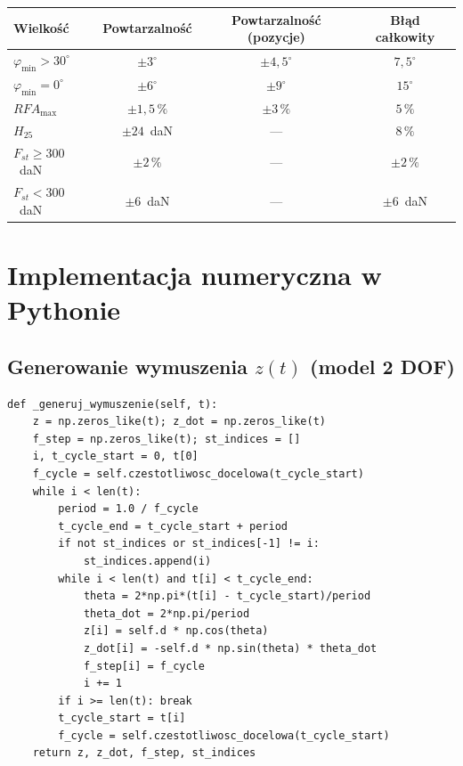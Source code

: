 \documentclass[11pt,a4paper]{article}
\theoremstyle{plainpol}
\begin{document}
\begin{center}
\begin{tabular}{lccc}
\toprule
\textbf{Wielkość} & \textbf{Powtarzalność} & \textbf{Powtarzalność (pozycje)} & \textbf{Błąd całkowity} \\
\midrule
$\varphi_{\min} > 30^\circ$ & $\pm 3^\circ$  & $\pm 4{,}5^\circ$ & $7{,}5^\circ$ \\
$\varphi_{\min} = 0^\circ$  & $\pm 6^\circ$  & $\pm 9^\circ$     & $15^\circ$ \\
$RFA_{\max}$                & $\pm 1{,}5\,\%$ & $\pm 3\,\%$      & $5\,\%$ \\
$H_{25}$                    & $\pm 24$~daN    & ---              & $8\,\%$ \\
$F_{st} \geq 300$~daN       & $\pm 2\,\%$     & ---              & $\pm 2\,\%$ \\
$F_{st} < 300$~daN          & $\pm 6$~daN     & ---              & $\pm 6$~daN \\
\bottomrule
\end{tabular}
\end{center}

\section{Implementacja numeryczna w Pythonie}\label{sec:kod}

\subsection{Generowanie wymuszenia $z(t)$ (model 2 DOF)}

\begin{lstlisting}[style=py, caption={Cykliczne generowanie $z(t)$, $\dot{z}(t)$, $f(t)$.}]
def _generuj_wymuszenie(self, t):
    z = np.zeros_like(t); z_dot = np.zeros_like(t)
    f_step = np.zeros_like(t); st_indices = []
    i, t_cycle_start = 0, t[0]
    f_cycle = self.czestotliwosc_docelowa(t_cycle_start)
    while i < len(t):
        period = 1.0 / f_cycle
        t_cycle_end = t_cycle_start + period
        if not st_indices or st_indices[-1] != i:
            st_indices.append(i)
        while i < len(t) and t[i] < t_cycle_end:
            theta = 2*np.pi*(t[i] - t_cycle_start)/period
            theta_dot = 2*np.pi/period
            z[i] = self.d * np.cos(theta)
            z_dot[i] = -self.d * np.sin(theta) * theta_dot
            f_step[i] = f_cycle
            i += 1
        if i >= len(t): break
        t_cycle_start = t[i]
        f_cycle = self.czestotliwosc_docelowa(t_cycle_start)
    return z, z_dot, f_step, st_indices
\end{lstlisting}
\end{document}

